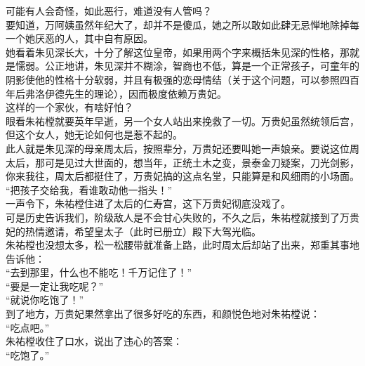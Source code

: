 \begin{multicols}{\theparacolNo}
可能有人会奇怪，如此恶行，难道没有人管吗？\\

要知道，万阿姨虽然年纪大了，却并不是傻瓜，她之所以敢如此肆无忌惮地除掉每一个她厌恶的人，其中自有原因。\\

她看着朱见深长大，十分了解这位皇帝，如果用两个字来概括朱见深的性格，那就是懦弱。公正地讲，朱见深并不糊涂，智商也不低，算是一个正常孩子，可童年的阴影使他的性格十分软弱，并且有极强的恋母情结（关于这个问题，可以参照四百年后弗洛伊德先生的理论），因而极度依赖万贵妃。\\

这样的一个家伙，有啥好怕？\\

眼看朱祐樘就要英年早逝，另一个女人站出来挽救了一切。万贵妃虽然统领后宫，但这个女人，她无论如何也是惹不起的。\\

此人就是朱见深的母亲周太后，按照辈分，万贵妃还要叫她一声娘亲。要说这位周太后，那可是见过大世面的，想当年，正统土木之变，景泰金刀疑案，刀光剑影，你来我往，周太后都挺住了，万贵妃搞的这点名堂，只能算是和风细雨的小场面。\\

“把孩子交给我，看谁敢动他一指头！”\\

一声令下，朱祐樘住进了太后的仁寿宫，这下万贵妃彻底没戏了。\\

可是历史告诉我们，阶级敌人是不会甘心失败的，不久之后，朱祐樘就接到了万贵妃的热情邀请，希望皇太子（此时已册立）殿下大驾光临。\\

朱祐樘也没想太多，松一松腰带就准备上路，此时周太后却站了出来，郑重其事地告诉他：\\

“去到那里，什么也不能吃！千万记住了！”\\

“要是一定让我吃呢？”\\

“就说你吃饱了！”\\

到了地方，万贵妃果然拿出了很多好吃的东西，和颜悦色地对朱祐樘说：\\

“吃点吧。”\\

朱祐樘收住了口水，说出了违心的答案：\\

“吃饱了。”\\


\end{multicols}
